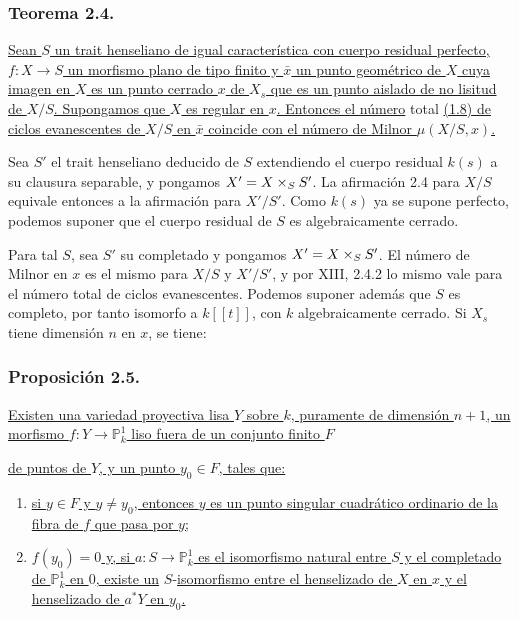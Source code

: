\subsubsection*{Teorema 2.4.}
\underline{Sean $S$ un trait henseliano de igual característica con
cuerpo residual perfecto, $f:X\to S$ un morfismo plano de tipo finito
y $\bar x$ un punto geométrico de $X$ cuya imagen en $X$ es un punto
cerrado $x$ de $X_s$ que es un punto aislado de no lisitud de $X/S$.
Supongamos que $X$ es regular en $x$. Entonces el número} total \underline{(1.8)
de ciclos evanescentes de $X/S$ en $\bar x$ coincide con el número de
Milnor $\mu(X/S,x)$.}

Sea $S'$ el trait henseliano deducido de $S$ extendiendo el cuerpo
residual $k(s)$ a su clausura separable, y pongamos
$X'=X\times_{\sisi{s}{S}}S'$. La afirmación 2.4 para $X/S$ equivale
entonces a la afirmación para $X'/S'$. Como $k(s)$ ya se supone
perfecto, podemos suponer que el cuerpo residual de $S$ es
algebraicamente cerrado.

Para tal $S$, sea $S'$ su completado y pongamos
$X'=X\times_{\sisi{s}{S}}S'$. El número de Milnor en $x$ es el mismo
para $X/S$ y $X'/S'$, y por XIII, 2.4.2 lo mismo vale para el número
total de ciclos evanescentes. Podemos suponer además que $S$ es
completo, por tanto isomorfo a $k[[t]]$, con $k$ algebraicamente
cerrado. Si $X_s$ tiene dimensión $n$ en $x$, se tiene:

\subsubsection*{Proposición 2.5.}
\underline{Existen una variedad proyectiva lisa $Y$ sobre $k$,
puramente de dimensión $n+1$, un morfismo
$f:Y\to\mathbb P^1_k$ liso fuera de un conjunto finito $F$}

\pageoriginale

\underline{de puntos de $Y$, y un punto $y_0\in F$, tales que:}
\begin{enumerate}
\item[(a)] \underline{si $y\in F$ y $y\ne y_0$, entonces $y$ es un
punto singular cuadrático ordinario de la fibra de $f$ que pasa por
$y$;}
\item[(b)] \underline{$f(y_0)=0$ y, si
$a:S\to\mathbb P^1_k$ es el isomorfismo natural entre $S$ y el
completado de $\mathbb P^1_k$ en $0$, existe un} $S$-\underline{isomorfismo entre
el henselizado de $X$ en $x$ y el henselizado de $a^*Y$ en $y_0$.}
\end{enumerate}

